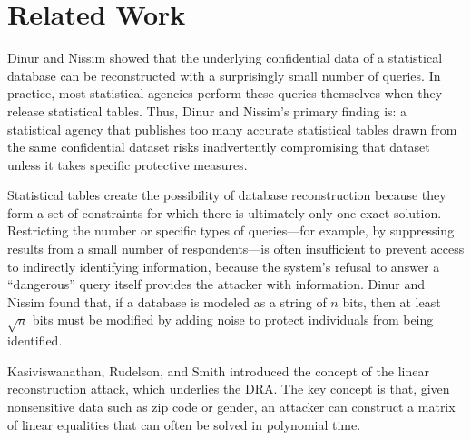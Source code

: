 \documentclass[runningheads]{llncs}
\newif\iflongversion
\begin{document}
\section{Related Work}

Dinur and Nissim\cite{noise} showed that the underlying
confidential data of a statistical database can be reconstructed with
a surprisingly small number of queries. In practice, most statistical
agencies perform these queries themselves when they release
statistical tables. Thus, Dinur and Nissim's primary finding
is: a statistical agency that publishes too many accurate statistical
tables drawn from the same confidential dataset risks inadvertently
compromising that dataset unless it takes specific protective measures.

Statistical tables create the possibility of database reconstruction
because they form a set of constraints for which there is ultimately
only one exact solution. Restricting
the number or specific types of queries---for example, by suppressing
results from a small number of respondents---is often insufficient to prevent access
to indirectly identifying information, because the system's refusal to
answer a ``dangerous'' query itself provides the attacker with information. 
Dinur and Nissim found that, if a database is modeled as a string of $n$ bits,
then at least $\sqrt{n}$ bits must be modified by adding noise to
protect individuals from being identified.

Kasiviswanathan, Rudelson, and Smith\cite{Kasiviswanathan:2013:PLR:2627817.2627919} introduced
the concept of the linear reconstruction attack, which underlies the  DRA. The key concept is that,
given nonsensitive data such as zip code or gender, an attacker
can construct a matrix of linear equalities that can often be solved
in polynomial time. \iflongversion The paper also analyzes a common reconstruction
technique known as least squares decoding, where the attacker sets up
a goal function to minimize the square of the distance between two
databases in order to reconstruct the original database.\fi

\iflongversion
Brown and Heathers\cite{doi:10.1177/1948550616673876} developed the
granularity-related inconsistency of means (GRIM) test in response to
observed inconsistencies in published data from psychological
journals. This test is centered around the premise that, for
statistics drawn from integer data, only certain means are
possible. The GRIM test determines whether reported means could
possibly have come from data sets with a certain size, granularity,
and group number. In surveying 71 published articles, the authors
found 36 papers with one inconsistency and 16 with two or more
inconsistencies. Although this test was intended to detect possible
errors or mean falsification in published articles, the concept of
drawing inferential conclusions about a data set based only on 
published statistics is a key concept behind the DRA.
\fi
\end{document}
